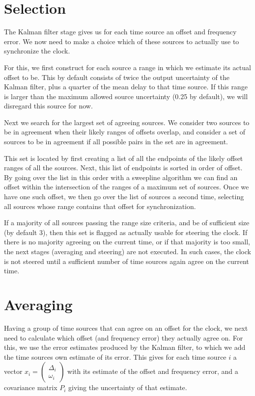 \documentclass{article}
\begin{document}
\section{Selection}\label{sec:selection}

The Kalman filter stage gives us for each time source an offset and frequency error.
We now need to make a choice which of these sources to actually use to synchronize the clock.

For this, we first construct for each source a range in which we estimate its actual offset to be.
This by default consists of twice the output uncertainty of the Kalman filter, plus a quarter of the mean delay to that time source.
If this range is larger than the maximum allowed source uncertainty (0.25 by default), we will disregard this source for now.

Next we search for the largest set of agreeing sources. We consider two sources to be in agreement when their likely ranges of offsets overlap,
and consider a set of sources to be in agreement if all possible pairs in the set are in agreement.

This set is located by first creating a list of all the endpoints of the likely offset ranges of all the sources.
Next, this list of endpoints is sorted in order of offset.
By going over the list in this order with a sweepline algorithm we can find an offset within the intersection of the ranges of a maximum set of sources.
Once we have one such offset, we then go over the list of sources a second time, selecting all sources whose range contains that offset for synchronization.

If a majority of all sources passing the range size criteria, and be of sufficient size (by default 3), then this set is flagged as actually usable for
steering the clock.
If there is no majority agreeing on the current time, or if that majority is too small, the next stages (averaging and steering) are not executed.
In such cases, the clock is not steered until a sufficient number of time sources again agree on the current time.

\section{Averaging}\label{sec:averaging}

Having a group of time sources that can agree on an offset for the clock, we next need to calculate which offset (and frequency error) they actually agree on.
For this, we use the error estimates produced by the Kalman filter, to which we add the time sources own estimate of its error.
This gives for each time source $i$ a vector $x_i = \begin{pmatrix}\Delta_i\\\omega_i\end{pmatrix}$ with its estimate of the offset and frequency error,
and a covariance matrix $P_i$ giving the uncertainty of that estimate.
\end{document}
